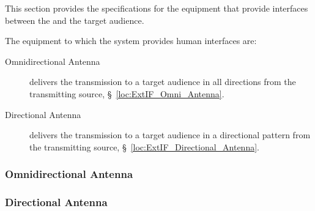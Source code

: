 This section provides the specifications for the equipment that provide interfaces between the \ThisSys and the target audience.

The equipment to which the system provides human interfaces are:
\begin{description}
	\item[Omnidirectional Antenna] delivers the transmission to a target audience in all directions from the transmitting source, \S~\ref{loc:ExtIF_Omni_Antenna}.
	\item[Directional Antenna] delivers the transmission to a target audience in a directional pattern from the transmitting source, \S~\ref{loc:ExtIF_Directional_Antenna}.
\end{description}

\KNEADSUBSUBSECTIONNEWPAGE
\subsubsection{Omnidirectional Antenna}
\label{loc:ExtIF_Omni_Antenna}



\KNEADSUBSUBSECTIONNEWPAGE
\subsubsection{Directional Antenna}
\label{loc:ExtIF_Directional_Antenna}

